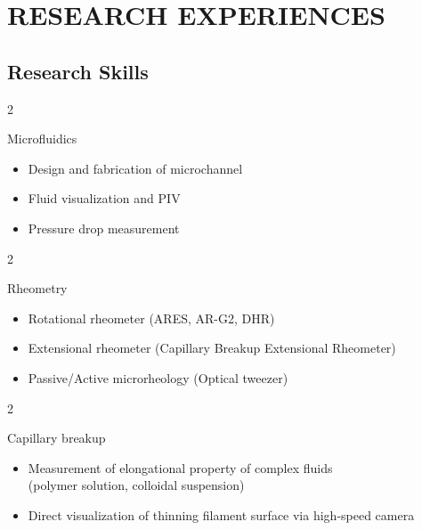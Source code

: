 \documentclass[11pt, a4paper]{article}
\newenvironment{highlights}{
    \begin{itemize}[
        topsep=0 cm,
        parsep=0.0 cm,
        partopsep=0.0pt,
        itemsep=0pt,
        leftmargin=0 cm + 10pt
    ]
}{
    \end{itemize}
} %
\newenvironment{twocolentry}[2][]{
    \onecolentry
    \def\secondColumn{#2}
    \setcolumnwidth{\fill, 13 cm}
    \begin{paracol}{2}
}{
    \switchcolumn \raggedright \secondColumn
    \end{paracol}
    \endonecolentry
} %
\begin{document}
      

    \section{RESEARCH EXPERIENCES}
    
    \subsection{Research Skills}
         \begin{twocolentry}
         {\begin{highlights}
            \item Design and fabrication of microchannel
            \item Fluid visualization and PIV
            \item Pressure drop measurement
           
         \end{highlights}}
         {Microfluidics}
         \end{twocolentry}
         
         \vspace{0.2 cm}
         
         \begin{twocolentry}
         {\begin{highlights}
            \item Rotational rheometer (ARES, AR-G2, DHR)
            \item Extensional rheometer (Capillary Breakup Extensional Rheometer)
            \item Passive/Active microrheology (Optical tweezer)
         \end{highlights}}
         {Rheometry}
         \end{twocolentry}

         \vspace{0.2 cm}
       
        \begin{twocolentry}
         {\begin{highlights}
            \item Measurement of elongational property of complex fluids \\(polymer solution, colloidal suspension)
            \item Direct visualization of thinning filament surface via high-speed camera
         \end{highlights}}
         {Capillary breakup}
         \end{twocolentry}
\end{document}
